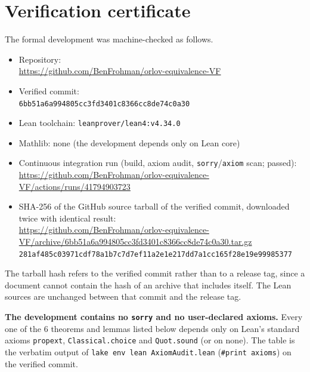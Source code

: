 \documentclass[11pt]{amsart}
\theoremstyle{definition}
\theoremstyle{remark}
\begin{document}
\section{Verification certificate}\label{app:verification-certificate}

The formal development was machine-checked as follows.

{\raggedright
\begin{itemize}
\item Repository:\\ {\footnotesize\url{https://github.com/BenFrohman/orlov-equivalence-VF}}
\item Verified commit:\\ {\footnotesize\texttt{6bb51a6a994805cc3fd3401c8366cc8de74c0a30}}
\item Lean toolchain: \texttt{leanprover/lean4:v4.34.0}
\item Mathlib: none (the development depends only on Lean core)
\item Continuous integration run (build, axiom audit, \texttt{sorry}/\texttt{axiom} scan; passed):\\ {\footnotesize\url{https://github.com/BenFrohman/orlov-equivalence-VF/actions/runs/41794903723}}
\item SHA-256 of the GitHub source tarball of the verified commit, downloaded twice with identical result:\\ {\footnotesize\url{https://github.com/BenFrohman/orlov-equivalence-VF/archive/6bb51a6a994805cc3fd3401c8366cc8de74c0a30.tar.gz}}\\
{\footnotesize\texttt{281af485c03971cdf78a1b7c7d7ef11a2e1e217dd7a1cc165f28e19e99985377}}
\end{itemize}\par}

The tarball hash refers to the verified commit rather than to a release tag, since a document cannot contain the hash of an archive that includes itself. The Lean sources are unchanged between that commit and the release tag.

\textbf{The development contains no \texttt{sorry} and no user-declared axioms.} Every one of the 6 theorems and lemmas listed below depends only on Lean's standard axioms \texttt{propext}, \texttt{Classical.choice} and \texttt{Quot.sound} (or on none). The table is the verbatim output of \texttt{lake env lean AxiomAudit.lean} (\texttt{\#print axioms}) on the verified commit.
\end{document}
